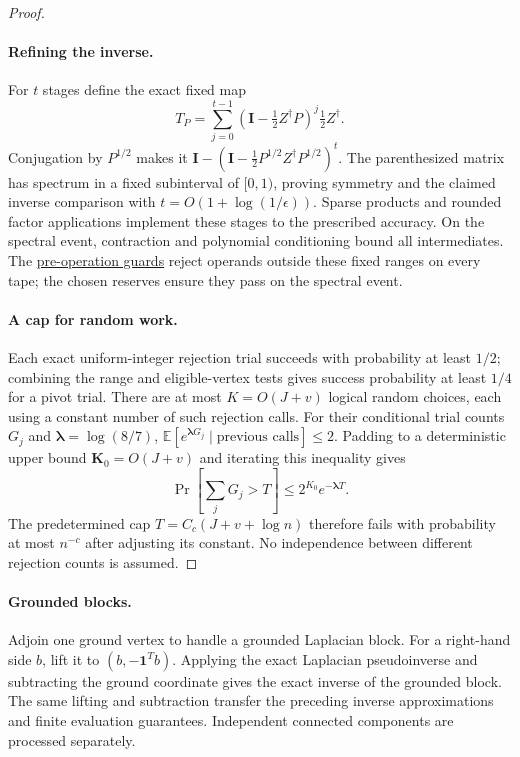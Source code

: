 \documentclass[11pt]{article}
\theoremstyle{remark}
\newcommand{\II}{\mathbf I}
\newcommand{\llambda}{\boldsymbol{\lambda}}
\newcommand{\KK}{\mathbf K}
\newcommand{\Ex}{\mathbb E}
\begin{document}
\begin{proof}
\paragraph{Refining the inverse.}
For $t$ stages define the exact fixed map
\[
 T_P=\sum_{j=0}^{t-1}(\II-\tfrac12Z^\dagger P)^j
                                      \tfrac12Z^\dagger.
\]
Conjugation by $P^{1/2}$ makes it $\II-(\II-\tfrac12P^{1/2}Z^\dagger P^{1/2})^t$.
The parenthesized matrix has spectrum in a fixed subinterval of $[0,1)$, proving
symmetry and the claimed inverse comparison with $t=O(1+\log(1/\epsilon))$.
Sparse products and rounded factor applications implement these stages to the
prescribed accuracy.
On the spectral event, contraction and polynomial conditioning bound all
intermediates.
The \hyperref[par:ram30-finite-arithmetic]{pre-operation guards} reject operands
outside these fixed ranges on every tape; the chosen reserves ensure they pass
on the spectral event.

\paragraph{A cap for random work.}
Each exact uniform-integer rejection trial succeeds with probability at least
$1/2$; combining the range and eligible-vertex tests gives success probability
at least $1/4$ for a pivot trial.
There are at most $K=O(J+v)$ logical random choices, each using a constant
number of such rejection calls.
For their conditional trial counts $G_j$ and $\llambda=\log(8/7)$,
$\Ex[e^{\llambda G_j}\mid \text{previous calls}]\le2$.
Padding to a deterministic upper bound $\KK_0=O(J+v)$ and iterating this
inequality gives
\[
 \Pr\!\left[\sum_jG_j>T\right]\le 2^{K_0}e^{-\llambda T}.
\]
The predetermined cap $T=C_c(J+v+\log n)$ therefore fails with probability at
most $n^{-c}$ after adjusting its constant.
No independence between different rejection counts is assumed.
\end{proof}

\paragraph{Grounded blocks.}
Adjoin one ground vertex to handle a grounded Laplacian block.
For a right-hand side $b$, lift it to $(b,-\mathbf1^Tb)$.
Applying the exact Laplacian pseudoinverse and subtracting the ground coordinate
gives the exact inverse of the grounded block.
The same lifting and subtraction transfer the preceding inverse approximations
and finite evaluation guarantees.
Independent connected components are processed separately.
\end{document}
